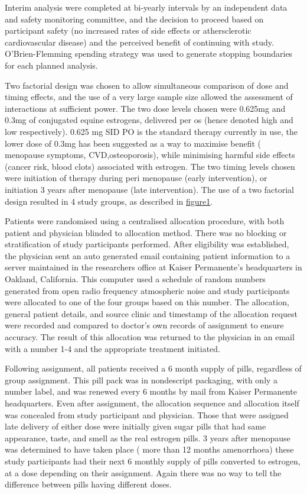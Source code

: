 \documentclass[11pt]{article}
\begin{document}
		Interim analysis were completed at bi-yearly intervals by an independent data and safety monitoring committee, and the decision to proceed based on participant safety (no increased rates of side effects or athersclerotic cardiovascular disease) and the perceived benefit of continuing with study.
		O’Brien-Flemming spending strategy was used to generate stopping boundaries for each planned analysis.


		Two factorial design was chosen to allow simultaneous comparison of dose and timing effects, and the use of a very large sample size allowed the assessment of interactions at sufficient power. 
		The two dose levels chosen were 0.625mg and 0.3mg of conjugated equine estrogens, delivered per os (hence denoted high and low respectively).
		0.625 mg SID PO is the standard therapy currently in use, the lower dose of 0.3mg has been suggested as a way to maximise benefit ( menopause symptoms, CVD,osteoporosis), while minimising harmful side effects (cancer risk, blood clots)  associated with estrogen.
		The two timing levels chosen were initiation of therapy during peri menopause (early intervention), or initiation 3 years after menopause (late intervention).
		The use of a two factorial design resulted in 4 study groups, as described in \hyperref[Figure 1]{figure1}.


		Patients were randomised using a centralised allocation procedure, with both patient and physician blinded to allocation method. 
		There was no blocking or stratification of study participants performed.
		After eligibility was established, the physician sent an auto generated email containing patient information to a server maintained in the researchers office at Kaiser Permanente's headquarters in Oakland, California. 
		This computer used a schedule of random numbers generated from open radio frequency atmospheric noise \cite{Eddelbuettel2009}  and study participants were allocated to one of the four groups based on this number.
		The allocation, general patient details, and source clinic and timestamp of the allocation request were recorded and compared to doctor's own records of assignment to ensure accuracy.
		The result of this allocation was returned to the physician in an email with a number 1-4 and the appropriate treatment initiated.


		Following assignment, all patients received a 6 month supply of pills, regardless of group assignment.
		This pill pack was in nondescript packaging, with only a number label, and was renewed every 6 months by mail from Kaiser Permanente headquarters.
		Even after assignment, the allocation sequence and allocation itself was concealed from study participant and physician.
		Those that were assigned late delivery of either dose were initially given sugar pills that had same appearance, taste, and smell as the real estrogen pills. 
		3 years after menopause was determined to have taken place ( more than 12 months amenorrhoea) these study participants had their next 6 monthly supply of pills converted to estrogen, at a dose depending on their assignment. Again there was no way to tell the difference between pills having different doses.
\end{document}
